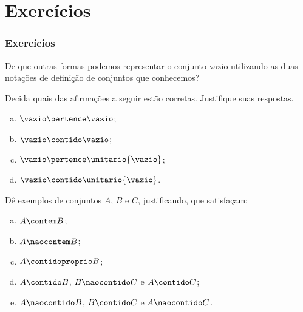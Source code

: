 \section{Exercícios}


\begin{frame}
	\frametitle{Exercícios}

	\begin{exercicio}
		De que outras formas podemos representar o conjunto vazio utilizando as duas notações de definição de conjuntos que conhecemos?
	\end{exercicio}


	\begin{exercicio}
		Decida quais das afirmações a seguir estão corretas. Justifique suas respostas.
		\begin{enumerate}[a)]
			\item $\vazio \pertence \vazio$;
			\item $\vazio \contido  \vazio$;
			\item $\vazio \pertence \unitario{\vazio}$;
			\item $\vazio \contido  \unitario{\vazio}$.
		\end{enumerate}
	\end{exercicio}

	\begin{exercicio}
		Dê exemplos de conjuntos $A$, $B$ e $C$, justificando, que satisfaçam:
		\begin{enumerate}[a)]
			\item $A \contem B$;
			\item $A \naocontem B$;
			\item $A \contidoproprio B$;
			\item $A \contido B$, $B \naocontido C$ e $A \contido C$;
			\item $A \naocontido B$, $B \contido C$ e $A \naocontido C$.
		\end{enumerate}
	\end{exercicio}
\end{frame}



